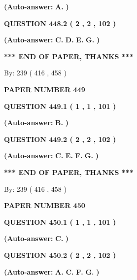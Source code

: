 \documentclass[12pt]{article}
\begin{document}
 
{\textbf{(Auto-answer:}}
{\textbf{\large{
A.}}}
{\textbf{)}}
 
 
  
  
{\textbf{\large{QUESTION
448.2 
 ( 2 , 2 , 102 )
}}}
 
 
{\textbf{(Auto-answer:}}
{\textbf{\large{
C.}}}
{\textbf{\large{
D.}}}
{\textbf{\large{
E.}}}
{\textbf{\large{
G.}}}
{\textbf{)}}
 
 
   
   
\vspace{1.0in} 
{\textbf{\large{ *** END OF PAPER, THANKS *** }}} 
   
   
\hspace{1.0in} By: 
 239 ( 416 ,  458 )
   
   
   
   
\newpage 
\setcounter{page}{ 
   449001 } 
   
   
 {\textbf{ \Large{ PAPER NUMBER  449  }}}
   
   
  
  
{\textbf{\large{QUESTION
449.1 
 ( 1 , 1 , 101 )
}}}
 
 
{\textbf{(Auto-answer:}}
{\textbf{\large{
B.}}}
{\textbf{)}}
 
 
  
  
{\textbf{\large{QUESTION
449.2 
 ( 2 , 2 , 102 )
}}}
 
 
{\textbf{(Auto-answer:}}
{\textbf{\large{
C.}}}
{\textbf{\large{
E.}}}
{\textbf{\large{
F.}}}
{\textbf{\large{
G.}}}
{\textbf{)}}
 
 
   
   
\vspace{1.0in} 
{\textbf{\large{ *** END OF PAPER, THANKS *** }}} 
   
   
\hspace{1.0in} By: 
 239 ( 416 ,  458 )
   
   
   
   
\newpage 
\setcounter{page}{ 
   450001 } 
   
   
 {\textbf{ \Large{ PAPER NUMBER  450  }}}
   
   
  
  
{\textbf{\large{QUESTION
450.1 
 ( 1 , 1 , 101 )
}}}
 
 
{\textbf{(Auto-answer:}}
{\textbf{\large{
C.}}}
{\textbf{)}}
 
 
  
  
{\textbf{\large{QUESTION
450.2 
 ( 2 , 2 , 102 )
}}}
 
 
{\textbf{(Auto-answer:}}
{\textbf{\large{
A.}}}
{\textbf{\large{
C.}}}
{\textbf{\large{
F.}}}
{\textbf{\large{
G.}}}
{\textbf{)}}
 
\end{document}
